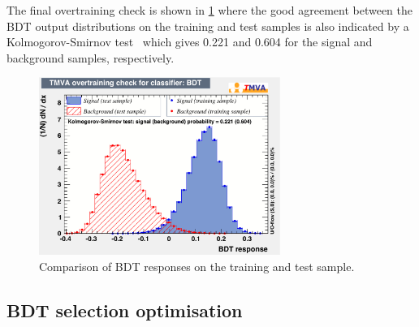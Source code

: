 The final overtraining check is shown in \cref{fig:BDTOVertraining} where the good agreement between the \ac{BDT} output distributions on the training and test samples is also indicated by a Kolmogorov-Smirnov test~\cite{Bohm:389738} which gives \num{0.221} and \num{0.604} for the signal and background samples, respectively.
\begin{figure}[tbp]
    \centering
    \includegraphics[width=0.7\textwidth]{06selection/figs/overtrain_BDT.pdf}
    \caption{Comparison of \ac{BDT} responses on the training and test sample.}
    \label{fig:BDTOVertraining}
\end{figure}

\subsection{BDT selection optimisation}
\label{sec:BDTOpt}

